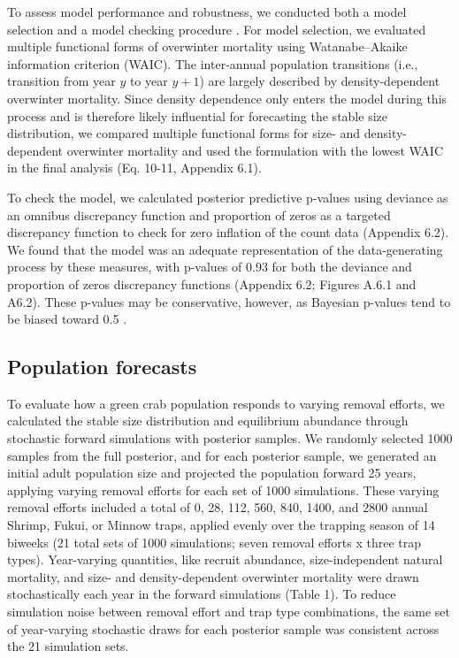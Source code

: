 \documentclass{article}
\begin{document}
To assess model performance and robustness, we conducted both a model selection and a model checking procedure \parencite{conn2018guide}. For model selection, we evaluated multiple functional forms of overwinter mortality using Watanabe–Akaike information criterion (WAIC). The inter-annual population transitions (i.e., transition from year $y$ to year $y + 1$) are largely described by density-dependent overwinter mortality. Since density dependence only enters the model during this process and is therefore likely influential for forecasting the stable size distribution, we compared multiple functional forms for size- and density-dependent overwinter mortality and used the formulation with the lowest WAIC in the final analysis (Eq. 10-11, Appendix 6.1).

To check the model, we calculated posterior predictive p-values using deviance as an omnibus discrepancy function and proportion of zeros as a targeted discrepancy function to check for zero inflation of the count data (Appendix 6.2). We found that the model was an adequate representation of the data-generating process by these measures, with p-values of 0.93 for both the deviance and proportion of zeros discrepancy functions (Appendix 6.2; Figures A.6.1 and A6.2). These p-values may be conservative, however, as Bayesian p-values tend to be biased toward 0.5 \parencite{conn2018guide}.


\subsection{Population forecasts}

To evaluate how a green crab population responds to varying removal efforts, we calculated the stable size distribution and equilibrium abundance through stochastic forward simulations with posterior samples. We randomly selected 1000 samples from the full posterior, and for each posterior sample, we generated an initial adult population size and projected the population forward 25 years, applying varying removal efforts for each set of 1000 simulations. These varying removal efforts included a total of 0, 28, 112, 560, 840, 1400, and 2800 annual Shrimp, Fukui, or Minnow traps, applied evenly over the trapping season of 14 biweeks (21 total sets of 1000 simulations; seven removal efforts x three trap types). Year-varying quantities, like recruit abundance, size-independent natural mortality, and size- and density-dependent overwinter mortality were drawn stochastically each year in the forward simulations (Table 1). To reduce simulation noise between removal effort and trap type combinations, the same set of year-varying stochastic draws for each posterior sample was consistent across the 21 simulation sets. 
\end{document}
